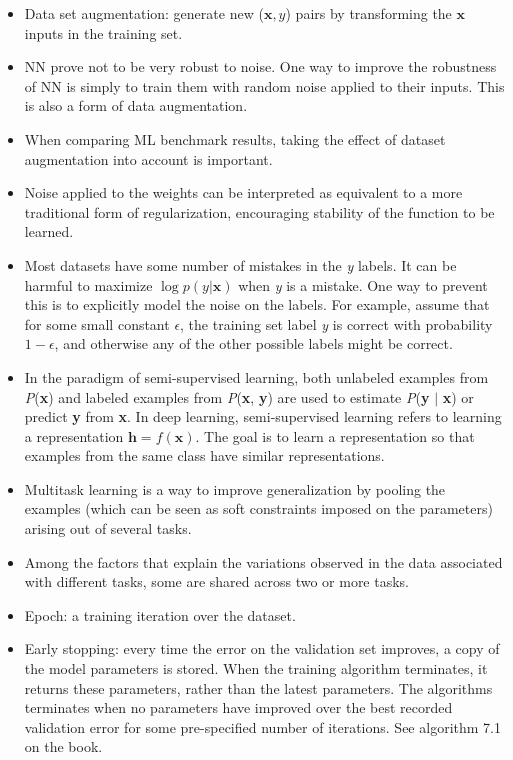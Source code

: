 \documentclass{article}
\begin{document}
\begin{itemize}
\item Data set augmentation: generate new (\(\boldsymbol{x}, y\)) pairs by transforming the \(\boldsymbol{x}\) inputs in the training set. 
\item NN prove not to be very robust to noise. One way to improve the robustness of NN is simply to train them with random noise applied to their inputs. This is also a form of data augmentation.
\item When comparing ML benchmark results, taking the effect of dataset augmentation into account is important.
\item Noise applied to the weights can be interpreted as equivalent to a more traditional form of regularization, encouraging stability of the function to be learned.
\item Most datasets have some number of mistakes in the \textit{y} labels. It can be harmful to maximize \(\log{p(y|\boldsymbol{x})}\) when \textit{y} is a mistake. One way to prevent this is to explicitly model the noise on the labels. For example, assume that for some small constant \(\epsilon\), the training set label \textit{y} is correct with probability \(1 - \epsilon\), and otherwise any of the other possible labels might be correct.
\item In the paradigm of semi-supervised learning, both unlabeled examples from \textit{P}(\textbf{x}) and labeled examples from \textit{P}(\textbf{x}, \textbf{y}) are used to estimate \textit{P}(\textbf{y} \(|\) \textbf{x}) or predict \textbf{y} from \textbf{x}. In deep learning, semi-supervised learning refers to learning a representation \(\boldsymbol{h} = f(\boldsymbol{x})\). The goal is to learn a representation so that examples from the same class have similar representations.
\item Multitask learning is a way to improve generalization by pooling the examples (which can be seen as soft constraints imposed on the parameters) arising out of several tasks.
\item Among the factors that explain the variations observed in the data associated with different tasks, some are shared across two or more tasks.
\item Epoch: a training iteration over the dataset.
\item Early stopping: every time the error on the validation set improves, a copy of the model parameters is stored. When the training algorithm terminates, it returns these parameters, rather than the latest parameters. The algorithms terminates when no parameters have improved over the best recorded validation error for some pre-specified number of iterations. See algorithm 7.1 on the book.

\end{itemize}
\end{document}
